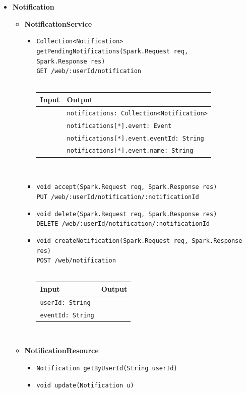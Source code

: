 \documentclass[a4paper, hidelinks, 12pt]{report}
\begin{document}
\begin{itemize}
		\item{\textbf{Notification}}
			\begin{itemize}
				\item{\textbf{NotificationService}}
					\begin{itemize}
						\item{\verb|Collection<Notification> getPendingNotifications(Spark.Request req,|\\ \verb|Spark.Response res)|\\ \verb|GET /web/:userId/notification|}\\\\
			\begin{tabular}{l | l}
			\textbf{Input} & \textbf{Output} \\
			\hline
				& \verb|notifications: Collection<Notification>| \\
				& \verb|notifications[*].event: Event| \\
				& \verb|notifications[*].event.eventId: String| \\
				& \verb|notifications[*].event.name: String| \\
			\end{tabular}\\
			\item{\verb|void accept(Spark.Request req, Spark.Response res)|\\ \verb|PUT /web/:userId/notification/:notificationId|}
			\item{\verb|void delete(Spark.Request req, Spark.Response res)|\\ \verb|DELETE /web/:userId/notification/:notificationId|}
			\item{\verb|void createNotification(Spark.Request req, Spark.Response res)|\\ \verb|POST /web/notification|}\\\\
			\begin{tabular}{l | l}
			\textbf{Input} & \textbf{Output} \\
			\hline
				\verb|userId: String| & \\
				\verb|eventId: String| & \\
			\end{tabular}\\
					\end{itemize}
					
				\item{\textbf{NotificationResource}}
					\begin{itemize}
						\item{\verb|Notification getByUserId(String userId)|}
						\item{\verb|void update(Notification u)|}
					\end{itemize}
					

\end{itemize}
\end{itemize}
\end{document}
